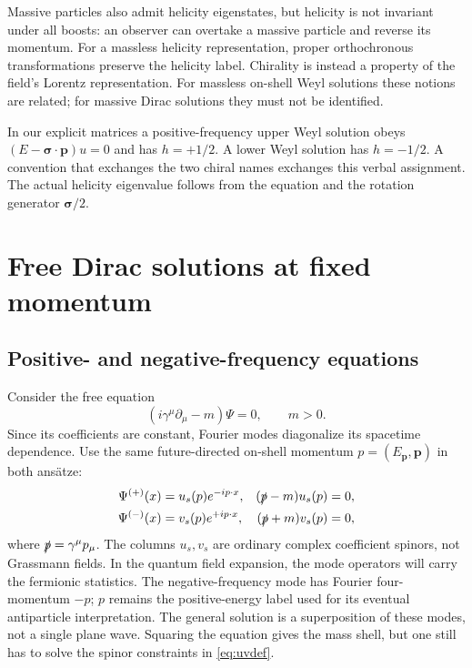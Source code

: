 \documentclass[11pt]{article}
\begin{document}
Massive particles also admit helicity eigenstates, but helicity is
not invariant under all boosts: an observer can overtake a massive
particle and reverse its momentum. For a massless helicity
representation, proper orthochronous transformations preserve the
helicity label. Chirality is instead a property of the field's
Lorentz representation. For massless on-shell Weyl solutions these
notions are related; for massive Dirac solutions they must not be
identified.

In our explicit matrices a positive-frequency upper Weyl solution
obeys \((E-\bm\sigma\cdot\bm p)u=0\) and has \(h=+1/2\).
A lower Weyl solution has \(h=-1/2\). A convention that exchanges
the two chiral names exchanges this verbal assignment. The actual
helicity eigenvalue follows from the equation and the rotation
generator \(\bm\sigma/2\).

\section{Free Dirac solutions at fixed momentum}
\subsection{Positive- and negative-frequency equations}
Consider the free equation
\begin{equation}
 (i\gamma^\mu\partial_\mu-m)\Psi=0,\qquad m>0.
 \label{eq:dirac}
\end{equation}
Since its coefficients are constant, Fourier modes diagonalize its
spacetime dependence. Use the same future-directed on-shell momentum
\(p=(E_{\bm p},\bm p)\) in both ans\"atze:
\begin{align}
 \Psi^{(+)}(x)&=u_s(p)e^{-ip\cdot x},
       & (\slashed p-m)u_s(p)&=0,\nonumber\\
 \Psi^{(-)}(x)&=v_s(p)e^{+ip\cdot x},
       & (\slashed p+m)v_s(p)&=0,
 \label{eq:uvdef}
\end{align}
where \(\slashed p=\gamma^\mu p_\mu\). The columns \(u_s,v_s\) are ordinary
complex coefficient spinors, not Grassmann fields. In the quantum field
expansion, the mode operators will carry the fermionic statistics.
The negative-frequency mode
has Fourier four-momentum \(-p\); \(p\) remains the positive-energy
label used for its eventual antiparticle interpretation.
The general solution is a superposition of these modes, not a single
plane wave. Squaring the equation gives the mass shell, but one still
has to solve the spinor constraints in \eqref{eq:uvdef}.
\end{document}
